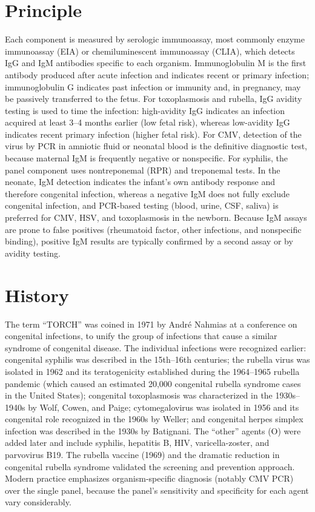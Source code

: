 \section*{Principle}
Each component is measured by serologic immunoassay, most commonly enzyme immunoassay (EIA) or chemiluminescent immunoassay (CLIA), which detects IgG and IgM antibodies specific to each organism. Immunoglobulin M is the first antibody produced after acute infection and indicates recent or primary infection; immunoglobulin G indicates past infection or immunity and, in pregnancy, may be passively transferred to the fetus. For toxoplasmosis and rubella, IgG avidity testing is used to time the infection: high-avidity IgG indicates an infection acquired at least 3--4 months earlier (low fetal risk), whereas low-avidity IgG indicates recent primary infection (higher fetal risk). For CMV, detection of the virus by PCR in amniotic fluid or neonatal blood is the definitive diagnostic test, because maternal IgM is frequently negative or nonspecific. For syphilis, the panel component uses nontreponemal (RPR) and treponemal tests. In the neonate, IgM detection indicates the infant's own antibody response and therefore congenital infection, whereas a negative IgM does not fully exclude congenital infection, and PCR-based testing (blood, urine, CSF, saliva) is preferred for CMV, HSV, and toxoplasmosis in the newborn. Because IgM assays are prone to false positives (rheumatoid factor, other infections, and nonspecific binding), positive IgM results are typically confirmed by a second assay or by avidity testing.

\section*{History}
The term ``TORCH'' was coined in 1971 by André Nahmias at a conference on congenital infections, to unify the group of infections that cause a similar syndrome of congenital disease. The individual infections were recognized earlier: congenital syphilis was described in the 15th--16th centuries; the rubella virus was isolated in 1962 and its teratogenicity established during the 1964--1965 rubella pandemic (which caused an estimated 20,000 congenital rubella syndrome cases in the United States); congenital toxoplasmosis was characterized in the 1930s--1940s by Wolf, Cowen, and Paige; cytomegalovirus was isolated in 1956 and its congenital role recognized in the 1960s by Weller; and congenital herpes simplex infection was described in the 1930s by Batignani. The ``other'' agents (O) were added later and include syphilis, hepatitis B, HIV, varicella-zoster, and parvovirus B19. The rubella vaccine (1969) and the dramatic reduction in congenital rubella syndrome validated the screening and prevention approach. Modern practice emphasizes organism-specific diagnosis (notably CMV PCR) over the single panel, because the panel's sensitivity and specificity for each agent vary considerably.

